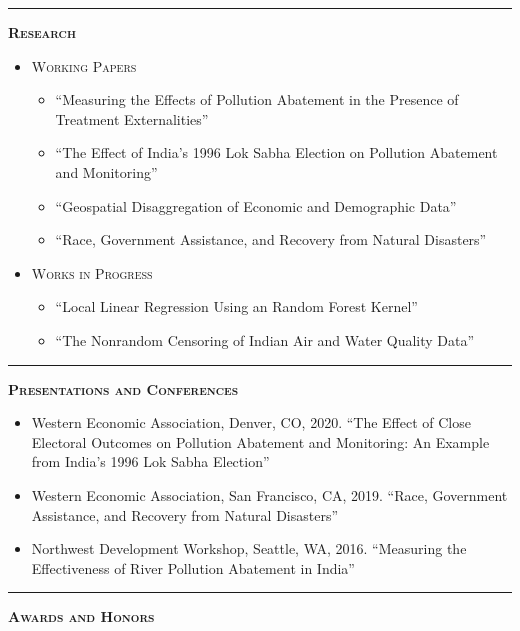 \documentclass[12pt]{article}
\begin{document}
\bigskip
\hrule
\bigskip 
\noindent \textsc{\large \textbf{Research}}

\begin{itemize}
\item[] \textsc{Working Papers}
\begin{itemize}[]
\item[] ``Measuring the Effects of Pollution Abatement in the Presence of Treatment \mbox{Externalities}''
\item[] ``The Effect of India's 1996 Lok Sabha Election on Pollution Abatement and Monitoring''
\item[] ``Geospatial Disaggregation of Economic and Demographic Data''
\item[] ``Race, Government Assistance, and Recovery from Natural Disasters''  
\end{itemize}

\item[] \textsc{Works in Progress}
  \begin{itemize}[]
\item[] ``Local Linear Regression Using an Random Forest Kernel''
\item[] ``The Nonrandom Censoring of Indian Air and Water Quality Data''
\end{itemize}
\end{itemize}

\bigskip
\hrule
\bigskip 
\noindent \textsc{\large \textbf{Presentations and Conferences}}

\begin{itemize}
\item[] Western Economic Association, Denver, CO, 2020. ``The Effect of Close Electoral Outcomes on Pollution Abatement and Monitoring: An Example from India's 1996 Lok Sabha Election''    
\item[] Western Economic Association, San Francisco, CA, 2019. ``Race, Government Assistance, and Recovery from Natural Disasters''  
\item[] Northwest Development Workshop, Seattle, WA, 2016. ``Measuring the Effectiveness of River Pollution Abatement in India''
\end{itemize}

\bigskip
\hrule
\bigskip 
\noindent \textsc{\large \textbf{Awards and Honors}}
\end{document}
